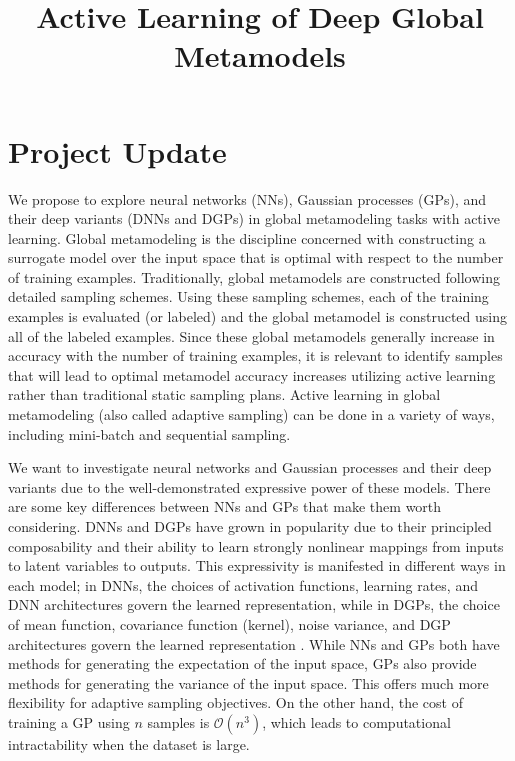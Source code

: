 \documentclass[conference]{IEEEtran}
\begin{document}
\title{\LARGE \textbf{Active Learning of Deep Global Metamodels} 
}


\author{
} %


\maketitle

\section{Project Update}
\label{sec:introduction}

We propose to explore neural networks (NNs), Gaussian processes (GPs), and their deep variants (DNNs and DGPs) in global metamodeling tasks with active learning. Global metamodeling is the discipline concerned with constructing a surrogate model over the input space that is optimal with respect to the number of training examples. Traditionally, global metamodels are constructed following detailed sampling schemes. Using these sampling schemes, each of the training examples is evaluated (or labeled) and the global metamodel is constructed using all of the labeled examples. Since these global metamodels generally increase in accuracy with the number of training examples, it is relevant to identify samples that will lead to optimal metamodel accuracy increases utilizing active learning rather than traditional static sampling plans. Active learning in global metamodeling (also called adaptive sampling) can be done in a variety of ways, including mini-batch and sequential sampling.

We want to investigate neural networks and Gaussian processes and their deep variants due to the well-demonstrated expressive power of these models. There are some key differences between NNs and GPs that make them worth considering. DNNs and DGPs have grown in popularity due to their principled composability and their ability to learn strongly nonlinear mappings from inputs to latent variables to outputs. This expressivity is manifested in different ways in each model; in DNNs, the choices of activation functions, learning rates, and DNN architectures govern the learned representation, while in DGPs, the choice of mean function, covariance function (kernel), noise variance, and DGP architectures govern the learned representation \cite{Damianou2013DeepProcesses}. While NNs and GPs both have methods for generating the expectation of the input space, GPs also provide methods for generating the variance of the input space. This offers much more flexibility for adaptive sampling objectives. On the other hand, the cost of training a GP using $n$ samples is $\mathcal{O}(n^3)$, which leads to computational intractability when the dataset is large.
\end{document}
